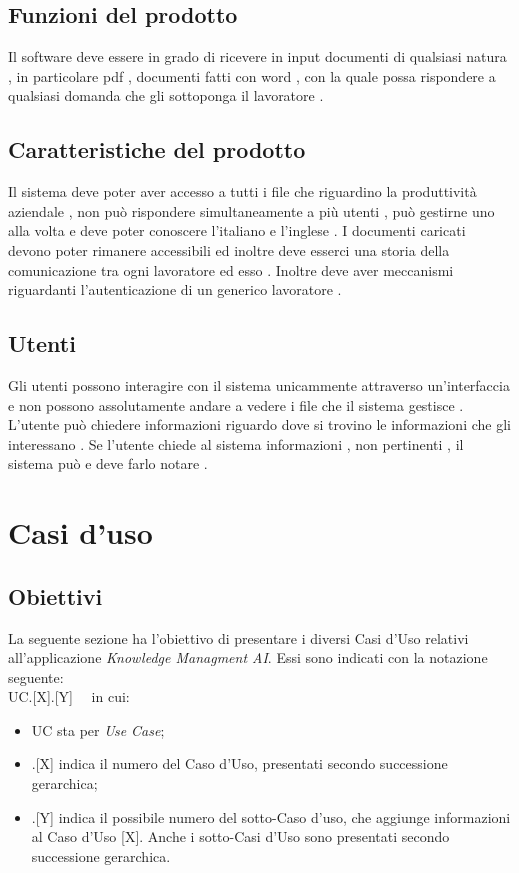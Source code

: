 \documentclass[10pt, a4paper]{article}
\begin{document}
\subsection{Funzioni del prodotto}
Il software deve essere in grado di ricevere in input documenti di qualsiasi natura , in particolare pdf , documenti fatti con word , con la quale possa rispondere a qualsiasi domanda che gli sottoponga il lavoratore . 
\subsection{Caratteristiche del prodotto}
Il sistema deve poter aver accesso a tutti i file che riguardino la produttività aziendale , non può rispondere simultaneamente a più utenti , può gestirne uno alla volta e deve poter conoscere l'italiano e l'inglese . I documenti caricati devono poter rimanere accessibili ed inoltre deve esserci una storia della comunicazione tra ogni lavoratore ed esso . Inoltre deve aver meccanismi riguardanti l'autenticazione di un generico lavoratore .
\subsection{Utenti}
Gli utenti possono interagire con il sistema unicammente attraverso un'interfaccia e non possono assolutamente andare a vedere i file che il sistema gestisce . L'utente può chiedere informazioni riguardo dove si trovino le informazioni che gli interessano . Se l'utente chiede al sistema informazioni , non pertinenti , il sistema può e deve farlo notare .
\newpage
\section{Casi d'uso}

\subsection{Obiettivi}
La seguente sezione ha l'obiettivo di presentare i diversi Casi d'Uso relativi all'applicazione \textit{Knowledge Managment AI}. Essi sono indicati con la notazione seguente: \\ UC.[X].[Y] \ \  in cui:
\begin{itemize}
\item UC sta per \textit{Use Case};
\item .[X] indica il numero del Caso d'Uso, presentati secondo successione gerarchica;
\item .[Y] indica il possibile numero del sotto-Caso d'uso, che aggiunge informazioni al Caso d'Uso [X]. Anche i sotto-Casi d'Uso sono presentati secondo successione gerarchica.
\end{itemize}
\end{document}
